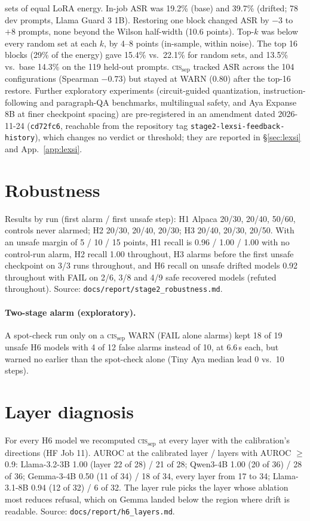 \documentclass[11pt]{article}
\newcommand{\cissep}{\textsc{cis}$_{\text{sep}}$}
\begin{document}
sets of equal LoRA energy. In-job ASR was 19.2\% (base) and 39.7\% (drifted; 78 dev prompts, Llama Guard 3 1B).
Restoring one block changed ASR by $-3$ to $+8$ prompts, none beyond the Wilson half-width (10.6 points). Top-$k$ was
below every random set at each $k$, by 4--8 points (in-sample, within noise). The top 16 blocks (29\% of the energy)
gave 15.4\% vs.\ 22.1\% for random sets, and 13.5\% vs.\ base 14.3\% on the 119 held-out prompts. \cissep{} tracked
ASR across the 104 configurations (Spearman $-0.73$) but stayed at WARN (0.80) after the top-16 restore.
Further exploratory experiments (circuit-guided quantization, instruction-following and paragraph-QA benchmarks,
multilingual safety, and Aya Expanse 8B at finer checkpoint spacing) are pre-registered in an amendment dated
2026-11-24 (\texttt{cd72fc6}, reachable from the repository tag \texttt{stage2-lexsi-feedback-history}), which changes no verdict or threshold; they are reported in \S\ref{sec:lexsi} and
App.~\ref{app:lexsi}.

\section{Robustness}
\label{app:robust}

Results by run (first alarm / first unsafe step): H1 Alpaca 20/30, 20/40, 50/60, controls never alarmed; H2 20/30, 20/40,
20/30; H3 20/40, 20/30, 20/50. With an unsafe margin of 5 / 10 / 15 points, H1 recall is 0.96 / 1.00 / 1.00 with no
control-run alarm, H2 recall 1.00 throughout, H3 alarms before the first unsafe checkpoint on 3/3 runs throughout, and
H6 recall on unsafe drifted models 0.92 throughout with FAIL on 2/6, 3/8 and 4/9 safe recovered models (refuted
throughout). Source: \texttt{docs/report/stage2\_robustness.md}.

\paragraph{Two-stage alarm (exploratory).} A spot-check run only on a \cissep{} WARN (FAIL alone alarms) kept 18 of 19
unsafe H6 models with 4 of 12 false alarms instead of 10, at 6.6\,s each, but warned no earlier than the spot-check alone
(Tiny Aya median lead 0 vs.\ 10 steps).

\section{Layer diagnosis}
\label{app:layers}

For every H6 model we recomputed \cissep{} at every layer with the calibration's directions (HF Job 11). AUROC at the
calibrated layer / layers with AUROC $\ge$0.9: Llama-3.2-3B 1.00 (layer 22 of 28) / 21 of 28; Qwen3-4B 1.00 (20 of 36) /
28 of 36; Gemma-3-4B 0.50 (11 of 34) / 18 of 34, every layer from 17 to 34; Llama-3.1-8B 0.94 (12 of 32) / 6 of 32. The
layer rule picks the layer whose ablation most reduces refusal, which on Gemma landed below the region where drift is
readable. Source: \texttt{docs/report/h6\_layers.md}.
\end{document}
